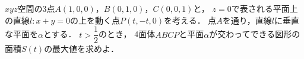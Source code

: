 \documentclass[../../main.tex]{subfiles}
\begin{document}
$xyz$空間の3点$A(1,0,0)$，$B(0,1,0)$，$C(0,0,1)$と，
$z=0$で表される平面上の直線$l:x+y=0$の上を動く点$P(t,-t,0)$を考える．
点$A$を通り，直線$l$に垂直な平面を$\alpha$とする．
$\displaystyle t>\dfrac{1}{2}$のとき，
4面体$ABCP$と平面$\alpha$が交わってできる図形の面積$S(t)$の最大値を求めよ．
\end{document}
